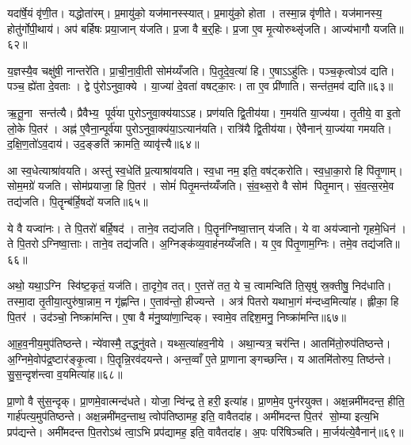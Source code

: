 यदा॑र्\mbox{}षे॒यं वृ॑णी॒त। यद्धोता॑रम्। प्र॒मायु॑को॒ यज॑मानस्स्यात्। प्र॒मायु॑को॒ होता। तस्मा॒न्न वृ॑णीते। यज॑मानस्य॒ होतु॑र्गोपी॒थाय॑। अप॑ बर्\mbox{}हिषः प्रया॒जान् य॑जति। प्र॒जा वै ब॒र्॒हिः। प्र॒जा ए॒व मृ॒त्योरुथ्सृ॑जति। आज्य॑भागौ यजति॥६२॥

य॒ज्ञस्यै॒व चक्षु॑षी॒ नान्तरे॑ति। प्रा॒ची॒ना॒वी॒ती सोम॑य्यँजति। पि॒तृ॒दे॒व॒त्या॑ हि। ए॒षाऽऽहु॑तिः। पञ्च॒कृत्वोऽव॑ द्यति। पञ्च॒ ह्ये॑ता दे॒वताः। द्वे पु॑रोऽनुवा॒क्ये। या॒ज्या॑ दे॒वता॑ वषट्का॒रः। ता ए॒व प्री॑णाति। सन्त॑त॒मव॑ द्यति॥६३॥

ऋ॒तू॒ना सन्त॑त्यै। प्रैवैभ्य॒ पूर्व॑या पुरोऽनुवा॒क्य॑याऽऽह। प्रण॑यति द्वि॒तीय॑या। ग॒मय॑ति या॒ज्य॑या। तृ॒तीये॒ वा इ॒तो लो॒के पि॒तर॑। अह्न॑ ए॒वैना॒न्पूर्व॑या पुरोऽनुवा॒क्य॑या॒ऽत्यान॑यति। रात्रि॑यै द्वि॒तीय॑या। ऐवैनान्॑ या॒ज्य॑या गमयति। द॒क्षि॒ण॒तो॑ऽव॒दाय॑। उद॒ङ्ङति॑ क्रामति॒ व्यावृ॑त्त्यै॥६४॥

आ स्व॒धेत्याश्रा॑वयति। अस्तु॑ स्व॒धेति॑ प्र॒त्याश्रा॑वयति। स्व॒धा नम॒ इति॒ वष॑ट्करोति। स्व॒धा॒का॒रो हि पि॑तृ॒णाम्। सोम॒मग्रे॑ यजति। सोम॑प्रयाजा॒ हि पि॒तर॑। सोमं॑ पितृ॒मन्त॑य्यँजति। सं॒व॒थ्स॒रो वै सोम॑ पितृ॒मान्। सं॒व॒त्स॒रमे॒व तद्य॑जति। पि॒तॄन्ब॑र्\mbox{}हि॒षदो॑ यजति॥६५॥

ये वै यज्वा॑नः। ते पि॒तरो॑ बर्\mbox{}हि॒षद॑। ताने॒व तद्य॑जति। पि॒तॄन॑ग्निष्वा॒त्तान् य॑जति। ये वा अय॑ज्वानो गृहमे॒धिन॑। ते पि॒तरोऽग्निष्वा॒त्ताः। ताने॒व तद्य॑जति। अ॒ग्निङ्क॑व्य॒वाह॑नय्यँजति। य ए॒व पि॑तृ॒णाम॒ग्निः। तमे॒व तद्य॑जति॥६६॥

अथो॒ यथा॒ऽग्नि स्वि॑ष्ट॒कृतं॒ यज॑ति। ता॒दृगे॒व तत्। ए॒तत्ते॑ तत॒ ये च॒ त्वामन्विति॑ ति॒सृषु॑ स्र॒क्तीषु॒ निद॑धाति। तस्मा॒दा तृ॒तीया॒त्पुरु॑षा॒न्नाम॒ न गृ॑ह्णन्ति। ए॒ताव॑न्तो॒ हीज्यन्ते। अत्र॑ पितरो यथाभा॒गं म॑न्दध्व॒मित्या॑ह। ह्लीका॒ हि पि॒तर॑। उद॑ञ्चो॒ निष्क्रा॑मन्ति। ए॒षा वै म॑नु॒ष्या॑णा॒न्दिक्। स्वामे॒व तद्दिश॒मनु॒ निष्क्रा॑मन्ति॥६७॥

आ॒ह॒व॒नीय॒मुप॑तिष्ठन्ते। न्ये॑वास्मै॒ तद्ध्नु॑वते। यथ्स॒त्या॑हव॒नीये। अथा॒न्यत्र॒ चर॑न्ति। आतमि॑तो॒रुप॑तिष्ठन्ते। अ॒ग्निमे॒वोप॑द्र॒ष्टार॑ङ्कृ॒त्वा। पि॒तॄन्नि॒रव॑दयन्ते। अन्त॒व्वाँ ए॒ते प्रा॒णानाङ्गच्छन्ति। य आतमि॑तोरुप॒ तिष्ठ॑न्ते। सु॒स॒न्दृश॑न्त्वा व॒यमित्या॑ह॥६८॥

प्रा॒णो वै सु॑स॒न्दृक्। प्रा॒णमे॒वात्मन्द॑धते। योजा॒ न्वि॑न्द्र ते॒ हरी॒ इत्या॑ह। प्रा॒णमे॒व पुन॑रयुक्त। अक्ष॒न्नमी॑मदन्त॒ हीति॒ गार्\mbox{}ह॑पत्य॒मुप॑तिष्ठन्ते। अक्ष॒न्नमी॑मद॒न्ताथ॒ त्वोप॑तिष्ठामह॒ इति॒ वावैतदा॑ह। अमी॑मदन्त पि॒तर॑ सो॒म्या इत्य॒भि प्रप॑द्यन्ते। अमी॑मदन्त पि॒तरोऽथ॑ त्वा॒ऽभि प्रप॑द्यामह॒ इति॒ वावैतदा॑ह। अ॒पः परि॑षिञ्चति। मा॒र्जय॑त्ये॒वैनान्॑॥६९॥

